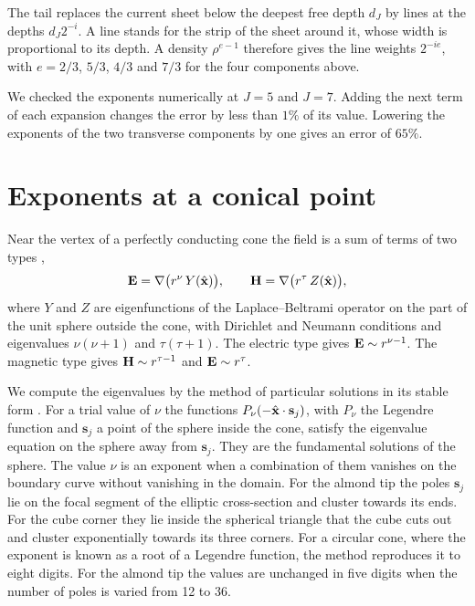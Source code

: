 The tail replaces the current sheet below the deepest free depth $d_J$ by lines at the depths $d_J2^{-i}$. A line stands for the strip of the sheet around it, whose width is proportional to its depth. A density $\rho^{e-1}$ therefore gives the line weights $2^{-ie}$, with $e = 2/3$, $5/3$, $4/3$ and $7/3$ for the four components above.

We checked the exponents numerically at $J = 5$ and $J = 7$. Adding the next term of each expansion changes the error by less than $1\%$ of its value. Lowering the exponents of the two transverse components by one gives an error of $65\%$.

\section{Exponents at a conical point}
\label{app:cone}

Near the vertex of a perfectly conducting cone the field is a sum of terms of two types \cite{vanbladel1996,desmedt1986},
\begin{equation}
  \mathbf{E} = \nabla\bigl(r^{\nu}\,Y(\hat{\mathbf{x}})\bigr), \qquad \mathbf{H} = \nabla\bigl(r^{\tau}\,Z(\hat{\mathbf{x}})\bigr),
\end{equation}
where $Y$ and $Z$ are eigenfunctions of the Laplace--Beltrami operator on the part of the unit sphere outside the cone, with Dirichlet and Neumann conditions and eigenvalues $\nu(\nu+1)$ and $\tau(\tau+1)$. The electric type gives $\mathbf{E}\sim r^{\nu-1}$. The magnetic type gives $\mathbf{H}\sim r^{\tau-1}$ and $\mathbf{E}\sim r^{\tau}$.

We compute the eigenvalues by the method of particular solutions in its stable form \cite{betcke2005}. For a trial value of $\nu$ the functions $P_\nu(-\hat{\mathbf{x}}\cdot\mathbf{s}_j)$, with $P_\nu$ the Legendre function and $\mathbf{s}_j$ a point of the sphere inside the cone, satisfy the eigenvalue equation on the sphere away from $\mathbf{s}_j$. They are the fundamental solutions of the sphere. The value $\nu$ is an exponent when a combination of them vanishes on the boundary curve without vanishing in the domain. For the almond tip the poles $\mathbf{s}_j$ lie on the focal segment of the elliptic cross-section and cluster towards its ends. For the cube corner they lie inside the spherical triangle that the cube cuts out and cluster exponentially towards its three corners. For a circular cone, where the exponent is known as a root of a Legendre function, the method reproduces it to eight digits. For the almond tip the values are unchanged in five digits when the number of poles is varied from 12 to 36.

